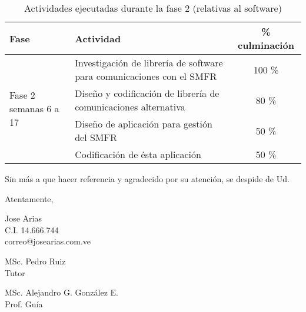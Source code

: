 \documentclass[paper=letter,oneside,fontsize=12pt, parskip=full]{article}
\begin{document}
	\begin{table}[h!]
		\begin{tabularx}{\textwidth}{p{}p{}c}
			\toprule
			{Fase} & 
			{Actividad} & 
			{\% culminación} \\
			\midrule
			\multirow{4}{0.15\textwidth}{Fase 2 \newline \small semanas 6 a 17} &
			Investigación de librería de software para comunicaciones con el SMFR & 100 \% \\
			& Diseño y codificación de librería de comunicaciones alternativa & 80 \% \\
			& Diseño de aplicación para gestión del SMFR & 50 \% \\
			& Codificación de ésta aplicación & 50 \% \\	
			\bottomrule	
		\end{tabularx}
		\caption{Actividades ejecutadas durante la fase 2 (relativas al software)}
	\end{table}	

	\newpage	

	Sin más a que hacer referencia y agradecido por su atención, se despide de Ud.	
	
	\begin{flushright}
		Atentamente, 			
	
		\vspace{2cm}
		\begin{singlespace}
			\large
			Jose Arias \\
			{
				\small
				C.I. 14.666.744 \\
				correo@josearias.com.ve \\			
			}	
		\end{singlespace}
	
	\end{flushright}


	\vfill

	\begin{minipage}{0.2\textwidth}
		\centering 
		\large
		MSc. Pedro Ruiz \\
		\small
		Tutor
	\end{minipage}%
	\hfill 
	\begin{minipage}{0.4\textwidth}
		\centering \large
		MSc. Alejandro G. González E.	\\	
		\small
		Prof. Guía
	\end{minipage}
	\\
	\vfill
\end{document}
